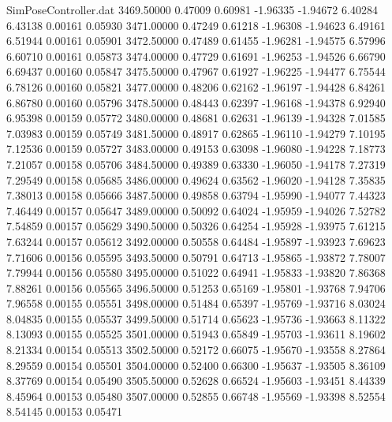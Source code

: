 \begin{filecontents}{SimPoseController.dat}
3469.50000    0.47009    0.60981    -1.96335   -1.94672    6.40284    6.43138    0.00161    0.05930
3471.00000    0.47249    0.61218    -1.96308   -1.94623    6.49161    6.51944    0.00161    0.05901
3472.50000    0.47489    0.61455    -1.96281   -1.94575    6.57996    6.60710    0.00161    0.05873
3474.00000    0.47729    0.61691    -1.96253   -1.94526    6.66790    6.69437    0.00160    0.05847
3475.50000    0.47967    0.61927    -1.96225   -1.94477    6.75544    6.78126    0.00160    0.05821
3477.00000    0.48206    0.62162    -1.96197   -1.94428    6.84261    6.86780    0.00160    0.05796
3478.50000    0.48443    0.62397    -1.96168   -1.94378    6.92940    6.95398    0.00159    0.05772
3480.00000    0.48681    0.62631    -1.96139   -1.94328    7.01585    7.03983    0.00159    0.05749
3481.50000    0.48917    0.62865    -1.96110   -1.94279    7.10195    7.12536    0.00159    0.05727
3483.00000    0.49153    0.63098    -1.96080   -1.94228    7.18773    7.21057    0.00158    0.05706
3484.50000    0.49389    0.63330    -1.96050   -1.94178    7.27319    7.29549    0.00158    0.05685
3486.00000    0.49624    0.63562    -1.96020   -1.94128    7.35835    7.38013    0.00158    0.05666
3487.50000    0.49858    0.63794    -1.95990   -1.94077    7.44323    7.46449    0.00157    0.05647
3489.00000    0.50092    0.64024    -1.95959   -1.94026    7.52782    7.54859    0.00157    0.05629
3490.50000    0.50326    0.64254    -1.95928   -1.93975    7.61215    7.63244    0.00157    0.05612
3492.00000    0.50558    0.64484    -1.95897   -1.93923    7.69623    7.71606    0.00156    0.05595
3493.50000    0.50791    0.64713    -1.95865   -1.93872    7.78007    7.79944    0.00156    0.05580
3495.00000    0.51022    0.64941    -1.95833   -1.93820    7.86368    7.88261    0.00156    0.05565
3496.50000    0.51253    0.65169    -1.95801   -1.93768    7.94706    7.96558    0.00155    0.05551
3498.00000    0.51484    0.65397    -1.95769   -1.93716    8.03024    8.04835    0.00155    0.05537
3499.50000    0.51714    0.65623    -1.95736   -1.93663    8.11322    8.13093    0.00155    0.05525
3501.00000    0.51943    0.65849    -1.95703   -1.93611    8.19602    8.21334    0.00154    0.05513
3502.50000    0.52172    0.66075    -1.95670   -1.93558    8.27864    8.29559    0.00154    0.05501
3504.00000    0.52400    0.66300    -1.95637   -1.93505    8.36109    8.37769    0.00154    0.05490
3505.50000    0.52628    0.66524    -1.95603   -1.93451    8.44339    8.45964    0.00153    0.05480
3507.00000    0.52855    0.66748    -1.95569   -1.93398    8.52554    8.54145    0.00153    0.05471

\end{filecontents}
